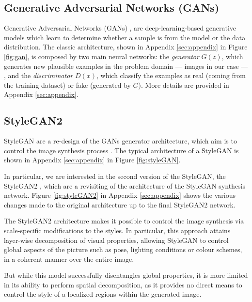 \documentclass{article}
\begin{document}
	\subsection{Generative Adversarial Networks (GANs)}\label{sec:gan}
	Generative Adversarial Networks (GANs) \cite{goodfellow2014generative}, are deep-learning-based 
	generative models which learn to determine whether a sample is from the model or the data 
	distribution. 
	The classic architecture, shown in Appendix \ref{sec:appendix} in Figure \ref{fig:gan}, is 
	composed by two main neural networks: 
	the \textit{generator} ${G(z)}$, which generates new plausible examples in the problem domain — 
	images in our case — , and the \textit{discriminator} ${D(x)}$, which classify the examples as 
	real (coming from the training dataset) or fake (generated by $G$). More details are provided in 
	Appendix \ref{sec:appendix}.
	
	\subsection{StyleGAN2}\label{sec:stylegan}
	StyleGAN are a re-design of the GANs generator architecture, which aim is to control the image 
	synthesis process \cite{karras2019style}. The typical architecture of a StyleGAN is shown in 
	Appendix \ref{sec:appendix} in Figure \ref{fig:styleGAN}.
	
	In particular, we are interested in the second version of the StyleGAN, the StyleGAN2 
	\cite{karras2020analyzing}, which are a revisiting of the architecture of the StyleGAN synthesis 
	network. Figure \ref{fig:styleGAN2} in Appendix \ref{sec:appendix} shows the various changes made 
	to the original architecture up to the final StyleGAN2 network.
	 
	The StyleGAN2 architecture makes it possible to control the image synthesis via scale-specific 
	modifications to the styles. In particular, this approach attains layer-wise decomposition of visual 
	properties, allowing StyleGAN to control global aspects of the picture such as pose, lighting 
	conditions or colour schemes, in a coherent manner over the entire image.
	
	But while this model successfully disentangles global properties, it is more limited in its ability to 
	perform spatial decomposition, as it provides no direct means to control the style of a localized 
	regions within the generated image.
\end{document}
